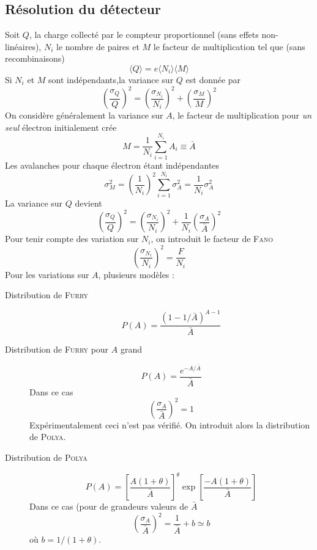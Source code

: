 \subsection{Résolution du détecteur}%
Soit $Q$, la charge collecté par le compteur proportionnel (sans effets non-linéaires), $N_i$ le
nombre de paires et $M$ le facteur de multiplication tel que (sans recombinaisons)
\begin{equation}
\langle Q \rangle = e\langle N_i \rangle \langle M \rangle
\end{equation}
Si $N_i$ et $M$ sont indépendants,la variance sur $Q$ est donnée par
\begin{equation}
\left(\frac{\sigma_{Q_{}}}{Q}\right)^2=\left(\frac{\sigma_{N_{i}}}{N_i}\right)^2+\left(\frac{\sigma_{M_{}}}{M}\right)^2
\end{equation}
On considère généralement la variance sur $A$, le facteur de multiplication pour \textit{un seul}
électron initialement crée
\begin{equation}
M=\frac{1}{N_i}\sum_{i=1}^{N_i}A_i\equiv\bar{A}
\end{equation}
Les avalanches pour chaque électron étant indépendantes
\begin{equation}
\sigma_M^2=\left(\frac{1}{N_i}\right)^2\sum_{i=1}^{N_i}\sigma_A^2=\frac{1}{N_i}\sigma_A^2
\end{equation}
La variance sur $Q$ devient
\begin{equation}
\left(\frac{\sigma_{Q_{}}}{Q}\right)^2=\left(\frac{\sigma_{N_{i}}}{N_i}\right)^2+\frac{1}{N_i}\left(\frac{\sigma_{A}}{\bar{A}}\right)^2
\end{equation}
Pour tenir compte des variation sur $N_i$, on introduit le facteur de \textsc{Fano}
\begin{equation}
\left(\frac{\sigma_{N_{i}}}{N_i}\right)^2=\frac{F}{N_i}
\end{equation}
Pour les variations sur $A$, plusieurs modèles :
\begin{description}
\item[Distribution de \textsc{Furry}] 
\begin{equation}
P(A)=\frac{(1-1/\bar{A})^{A-1}}{\bar{A}}
\end{equation}
\item[Distribution de \textsc{Furry} pour $A$ grand]
\begin{equation}
P(A)=\frac{e^{-A/\bar{A}}}{\bar{A}}
\end{equation}
Dans ce cas
\begin{equation}
\left(\frac{\sigma_A}{\bar{A}}\right)^2=1
\end{equation}
Expérimentalement ceci n'est pas vérifié. On introduit alors la distribution de \textsc{Polya}.
\item[Distribution de \textsc{Polya}]
\begin{equation}
P(A)=\left[\frac{A(1+\theta)}{\bar{A}}\right]^\theta\exp{\left[\frac{-A(1+\theta)}{\bar{A}}\right]}
\end{equation}
Dans ce cas (pour de grandeurs valeurs de $\bar A$
\begin{equation}
\left(\frac{\sigma_A}{\bar{A}}\right)^2=\frac{1}{\bar{A}}+b\simeq b
\end{equation}
où $b=1/(1+\theta)$.
\end{description}

